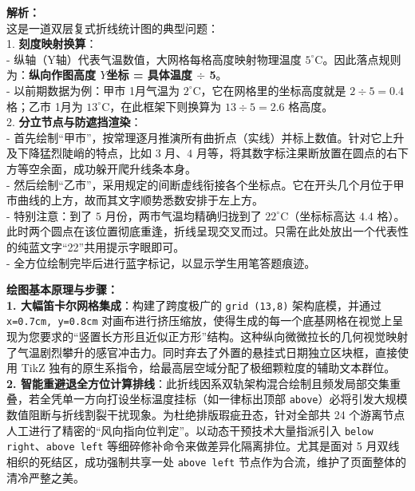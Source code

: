 \vspace{0.8cm}

{\small\color{gray}
\textbf{解析：}\\
这是一道双层复式折线统计图的典型问题：\\
1. \textbf{刻度映射换算}：\\
- 纵轴（Y轴）代表气温数值，大网格每格高度映射物理温度 $5^\circ$C。因此落点规则为：\textbf{纵向作图高度 $Y$坐标 = 具体温度 $\div$ 5}。\\
- 以前期数据为例：甲市 1月气温为 $2^\circ$C，它在网格里的坐标高度就是 $2 \div 5 = 0.4$ 格；乙市 1月为 $13^\circ$C，在此框架下则换算为 $13 \div 5 = 2.6$ 格高度。\\
2. \textbf{分立节点与防遮挡渲染}：\\
- 首先绘制“甲市”，按常理逐月推演所有曲折点（实线）并标上数值。针对它上升及下降猛烈陡峭的特点，比如 $3$ 月、$4$ 月等，将其数字标注果断放置在圆点的右下方等空余面，成功躲开爬升线条本身。\\
- 然后绘制“乙市”，采用规定的间断虚线衔接各个坐标点。它在开头几个月位于甲市曲线的上方，故而其文字顺势悉数安排于左上方。\\
- 特别注意：到了 $5$ 月份，两市气温均精确归拢到了 $22^\circ$C（坐标标高达 $4.4$ 格）。此时两个圆点在该位置彻底重逢，折线呈现交叉而过。只需在此处放出一个代表性的纯蓝文字“22”共用提示字眼即可。\\
- 全方位绘制完毕后进行蓝字标记，以显示学生用笔答题痕迹。
}

\vspace{0.6cm}

{\small\color{blue!70!black}
\textbf{绘图基本原理与步骤：}\\
\textbf{1. 大幅笛卡尔网格集成}：构建了跨度极广的 \texttt{grid (13,8)} 架构底模，并通过 \texttt{x=0.7cm, y=0.8cm} 对画布进行挤压缩放，使得生成的每一个底基网格在视觉上呈现为您要求的“竖置长方形且近似正方形”结构。这种纵向微微拉长的几何视觉映射了气温剧烈攀升的感官冲击力。同时弃去了外置的悬挂式日期独立区块框，直接使用 TikZ 独有的原生系指令，给最高层空域分配了极细颗粒度的辅助文本群位。\\
\textbf{2. 智能重避退全方位计算排线}：此折线因系双轨架构混合绘制且频发局部交集重叠，若全凭单一方向打设坐标温度挂标（如一律标出顶部 \texttt{above}）必将引发大规模数值阻断与折线割裂干扰现象。为杜绝排版瑕疵丑态，针对全部共 24 个游离节点人工进行了精密的“风向指向位判定”。以动态干预技术大量指派引入 \texttt{below right}、\texttt{above left} 等细碎修补命令来做差异化隔离排位。尤其是面对 5 月双线相织的死结区，成功强制共享一处 \texttt{above left} 节点作为合流，维护了页面整体的清冷严整之美。
}

